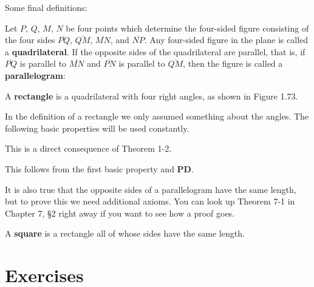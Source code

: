 \documentclass[12pt]{book} %
\begin{document}


Some final definitions:

Let $P$, $Q$, $M$, $N$ be four points which determine the four-sided figure consisting of the four sides $\overline{PQ}$, $\overline{QM}$, $\overline{MN}$, and $\overline{NP}$. Any four-sided figure in the plane is called a \textbf{quadrilateral}. If the opposite sides of the quadrilateral are parallel, that is, if $\overline{PQ}$ is parallel to $\overline{MN}$ and $\overline{PN}$ is parallel to $\overline{QM}$, then the figure is called a \textbf{parallelogram}:


A \textbf{rectangle} is a quadrilateral with four right angles, as shown in Figure 1.73.


In the definition of a rectangle we only assumed something about the angles. The following basic properties will be used constantly.


This is a direct consequence of Theorem 1-2.


This follows from the first basic property and \textbf{PD}.

It is also true that the opposite sides of a parallelogram have the same length, but to prove this we need additional axioms. You can look up Theorem 7-1 in Chapter 7, \S2 right away if you want to see how a proof goes.

A \textbf{square} is a rectangle all of whose sides have the same length.

\section*{Exercises}
\end{document}
